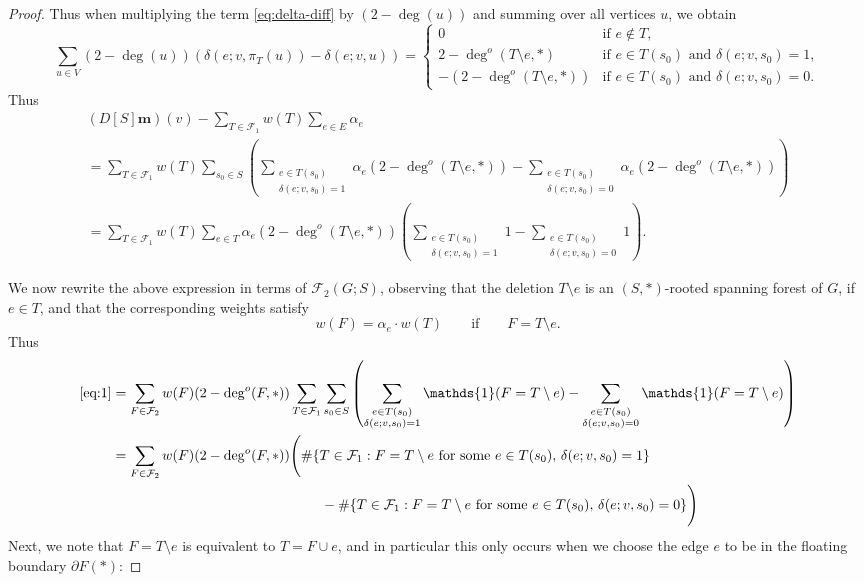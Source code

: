\documentclass{amsart}
\theoremstyle{definition}
\newcommand{\one}{\mathds{1}}
\newcommand{\boldm}{\mathbf{m}}
\newcommand{\trees}{\mathcal{F}_1}
\newcommand{\forests}{\mathcal{F}}
\newcommand{\degout}{\deg^o}
\begin{document}
\begin{proof}
Thus when multiplying the term \eqref{eq:delta-diff} by $(2 - \deg(u))$ and summing over all vertices $u$, we obtain
\[
	\sum_{u \in V} (2 - \deg(u)) (\delta(e; v, \pi_T(u)) - \delta(e; v, u)) = \begin{cases}
	0 &\text{if } e \not \in T, \\
	2 - \degout(T \setminus e, *) &\text{if } e \in T(s_0) \text{ and } \delta(e; v, s_0) = 1, \\
	-(2 - \degout(T \setminus e, *)) &\text{if } e \in T(s_0) \text{ and } \delta(e; v, s_0) = 0 .
	\end{cases}
\]
Thus
\begin{multline}\label{eq:1}
	(D[S] \boldm)(v) - \sum_{T \in \trees} w(T) \sum_{e \in E} \alpha_e \\
	= \sum_{T\in \trees} w(T) \sum_{s_0 \in S} \left( \sum_{\substack{e \in T(s_0) \\ \delta(e;v,s_0) = 1}} \alpha_e ( 2 - \deg^o(T\setminus e,*)) 
	- \sum_{\substack{e  \in T(s_0) \\ \delta(e;v,s_0) = 0}} \alpha_e (2 - \deg^o(T\setminus e,*) ) \right)\\
	= \sum_{T\in \trees} w(T) \sum_{e \in T} \alpha_e ( 2 - \deg^o(T\setminus e,*)) \left( \sum_{\substack{e \in T(s_0) \\ \delta(e;v,s_0) = 1}} 1
	- \sum_{\substack{e  \in T(s_0) \\ \delta(e;v,s_0) = 0}} 1 \right).
\end{multline}

We now rewrite the above expression in terms of $\forests_2(G;S)$,
observing that the deletion $T \setminus e$ is an $(S,*)$-rooted spanning forest of $G$, if $e \in T$, and that the corresponding weights satisfy
\[
	w(F) = \alpha_e \cdot w(T) \qquad\text{if}\qquad F = T \setminus e.
\]
Thus
\begin{align*}
	\eqref{eq:1} &= \sum_{F \in \forests_2} w(F) (2 - \deg^o(F,*)) \sum_{T\in \trees} \sum_{s_0 \in S} \left( \sum_{\substack{e \in T(s_0) \\ \delta(e; v,s_0) = 1}} \one(F = T \setminus e) -  \sum_{\substack{e \in T(s_0) \\ \delta(e; v,s_0) = 0}} \one(F = T \setminus e) \right) \\
	&= \sum_{F \in \forests_2} w(F) (2 - \deg^o(F,*)) \Bigg( \#\{T \in \trees : F = T \setminus e \text{ for some } e \in T(s_0),\, \delta(e;v,s_0) = 1 \} \\
	&\qquad\qquad\qquad\qquad\qquad\qquad\qquad\quad - \#\{T \in \trees : F = T \setminus e \text{ for some } e \in T(s_0),\, \delta(e; v,s_0) = 0 \} \Bigg)
\end{align*}
Next, we note that $F = T \setminus e$ is equivalent to $T = F \cup e$, and in particular this only occurs when we choose the edge $e$ to be in the floating boundary $\partial F(*)$:


\end{proof}
\end{document}
